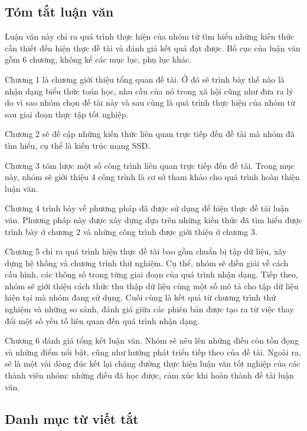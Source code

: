 \documentclass[a4paper,12pt]{article}
\begin{document}
	\newpage
	\subsection*{Tóm tắt luận văn}
	
	Luận văn  này chỉ ra quá trình thực hiện của nhóm từ tìm hiểu những kiến thức cần thiết đến hiện thực đề tài và đánh giá kết quả đạt được. Bố cục của luận văn gồm 6 chương, không kể các mục lục, phụ lục khác. 
	
	Chương 1 là chương giới thiệu tổng quan đề tài. Ở đó sẽ trình bày thế nào là nhận dạng biểu thức toán học, nhu cầu của nó trong xã hội cũng như đưa ra lý do vì sao nhóm chọn đề tài này và sau cùng là quá trình thực hiện của nhóm từ sau giai đoạn thực tập tốt nghiệp.
	
	Chương 2 sẽ đề cập những kiến thức liên quan trực tiếp đến đề tài mà nhóm đã tìm hiểu, cụ thể là kiến trúc mạng SSD.
	
	Chương 3 tóm lược một số công trình liên quan trực tiếp đến đề tài. Trong mục này, nhóm sẽ giới thiệu 4 công trình là cơ sở tham khảo cho quá trình hoàn thiện luận văn. 
	
	Chương 4 trình bày về phương pháp đã được sử dụng để hiện thực đề tài luận văn. Phương pháp này được xây dựng dựa trên những kiến thức đã tìm hiểu được trình bày ở chương 2 và những công trình được giới thiệu ở chương 3.
	
	Chương 5 chỉ ra quá trình hiện thực đề tài bao gồm chuẩn bị tập dữ liệu, xây dựng hệ thống và chương trình thử nghiệm. Cụ thể, nhóm sẽ diễn giải về cách cấu hình, các thông số trong từng giai đoạn của quá trình nhận dạng. Tiếp theo, nhóm sẽ giới thiệu cách thức thu thập dữ liệu cùng một số mô tả cho tập dữ liệu hiện tại mà nhóm đang sử dụng. Cuối cùng là kết quả từ chương trình thử nghiệm và những so sánh, đánh giá giữa các phiên bản được tạo ra từ việc thay đổi một số yếu tố liên quan đến quá trình nhận dạng. 
	
	Chương 6 đánh giá tổng kết luận văn. Nhóm sẽ nêu lên những điều còn tồn đọng và những điểm nổi bật, cũng như hướng phát triển tiếp theo của đề tài. Ngoài ra, sẽ là một vài dòng đúc kết lại chặng đường thực hiện luận văn tốt nghiệp của các thành viên nhóm: những điều đã học được, cảm xúc khi hoàn thành đề tài luận văn.
	\newpage
	\setlength{\cftsecnumwidth}{3cm}
	\tableofcontents
	\newpage
	\listoffigures
	\newpage
	\listoftables
	\newpage
	
	\subsection*{Danh mục từ viết tắt}
	
\end{document}
